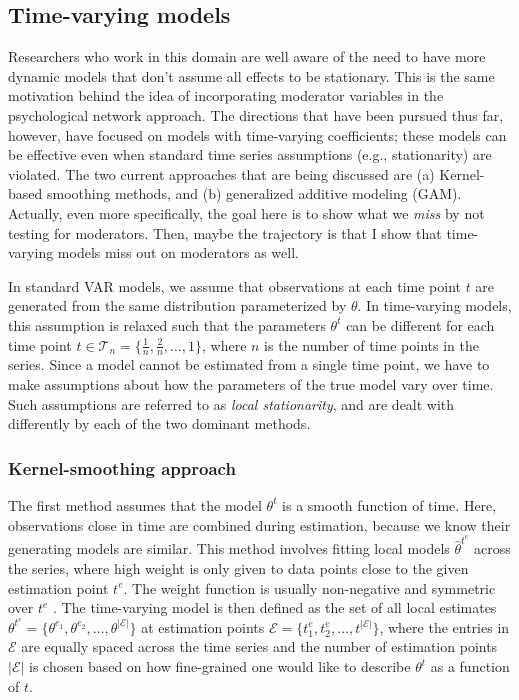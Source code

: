 \subsection{Time-varying models}
Researchers who work in this domain are well aware of the need to have more dynamic models that don't assume all effects to be stationary. This is the same motivation behind the idea of incorporating moderator variables in the psychological network approach. The directions that have been pursued thus far, however, have focused on models with time-varying coefficients; these models can be effective even when standard time series assumptions (e.g., stationarity) are violated. The two current approaches that are being discussed are (a) Kernel-based smoothing methods, and (b) generalized additive modeling (GAM). Actually, even more specifically, the goal here is to show what we \textit{miss} by not testing for moderators. Then, maybe the trajectory is that I show that time-varying models miss out on moderators as well.

In standard VAR models, we assume that observations at each time point $t$ are generated from the same distribution parameterized by $\theta$. In time-varying models, this assumption is relaxed such that the parameters $\theta^t$ can be different for each time point $t \in \mathcal{T}_n = \{\frac{1}{n}, \frac{2}{n}, \dots, 1\}$, where $n$ is the number of time points in the series. Since a model cannot be estimated from a single time point, we have to make assumptions about how the parameters of the true model vary over time. Such assumptions are referred to as \textit{local stationarity}, and are dealt with differently by each of the two dominant methods. 

\subsubsection{Kernel-smoothing approach}
The first method assumes that the model $\theta^t$ is a smooth function of time. Here, observations close in time are combined during estimation, because we know their generating models are similar. This method involves fitting local models $\hat{\theta}^{t^e}$ across the series, where high weight is only given to data points close to the given estimation point $t^e$. The weight function is usually non-negative and symmetric over $t^e$ \cite{zhou2010time}. The time-varying model is then defined as the set of all local estimates $\theta^{t^e} = \{\theta^{e_1}, \theta^{e_2}, \dots, \theta^{|\mathcal{E}|} \}$ at estimation points $\mathcal{E} = \{t_{1}^e, t_{2}^e, \dots, t^{|\mathcal{E}|} \}$, where the entries in $\mathcal{E}$ are equally spaced across the time series and the number of estimation points $|\mathcal{E}|$ is chosen based on how fine-grained one would like to describe $\theta^t$ as a function of $t$. 


